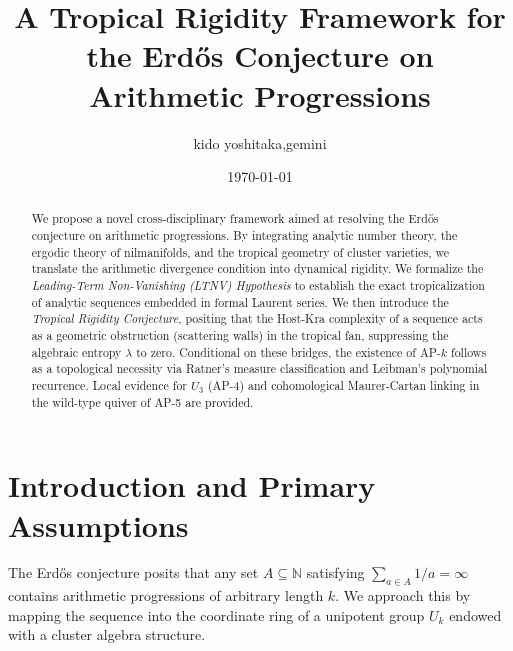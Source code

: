 \documentclass[11pt, a4paper, reqno]{amsart}
\theoremstyle{definition}
\newcommand{\N}{\mathbb{N}}
\begin{document}
\title[A Tropical Rigidity Framework for the Erd\H{o}s Conjecture]{A Tropical Rigidity Framework for the Erd\H{o}s Conjecture on Arithmetic Progressions}

\author{kido yoshitaka,gemini}
\address{kanagawa, Japan}
\date{\today}

\begin{abstract}
We propose a novel cross-disciplinary framework aimed at resolving the Erd\H{o}s conjecture on arithmetic progressions. By integrating analytic number theory, the ergodic theory of nilmanifolds, and the tropical geometry of cluster varieties, we translate the arithmetic divergence condition into dynamical rigidity. We formalize the \emph{Leading-Term Non-Vanishing (LTNV) Hypothesis} to establish the exact tropicalization of analytic sequences embedded in formal Laurent series. We then introduce the \emph{Tropical Rigidity Conjecture}, positing that the Host-Kra complexity of a sequence acts as a geometric obstruction (scattering walls) in the tropical fan, suppressing the algebraic entropy $\lambda$ to zero. Conditional on these bridges, the existence of AP-$k$ follows as a topological necessity via Ratner's measure classification and Leibman's polynomial recurrence. Local evidence for $U_3$ (AP-4) and cohomological Maurer-Cartan linking in the wild-type quiver of AP-5 are provided.
\end{abstract}

\maketitle

\section{Introduction and Primary Assumptions}
The Erd\H{o}s conjecture posits that any set $A \subseteq \N$ satisfying $\sum_{a \in A} 1/a = \infty$ contains arithmetic progressions of arbitrary length $k$. We approach this by mapping the sequence into the coordinate ring of a unipotent group $U_k$ endowed with a cluster algebra structure.
\end{document}
